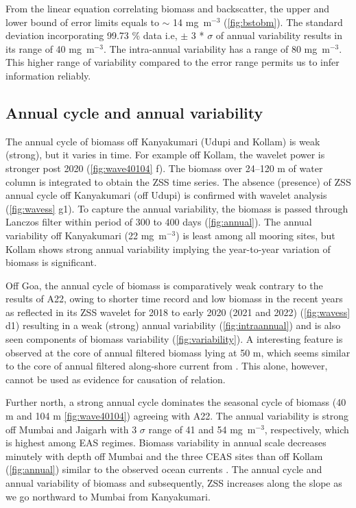 \documentclass{article}
\begin{document}
	From the linear equation correlating biomass and backscatter, the upper and lower bound of error limits equals to $\sim$ 14 mg~m$^{-3}$ (\cref{fig:bstobm}). The standard deviation incorporating 99.73 \% data i.e, $\pm$ 3 * $\sigma$ of annual variability results in its range of 40 mg~m$^{-3}$. The intra-annual variability has a range of 80 mg~m$^{-3}$. This higher range of variability compared to the error range permits us to infer information reliably. 
	
	\subsection{Annual cycle and annual variability}
	\label{sec:annualvar}
    The annual cycle of biomass off Kanyakumari (Udupi and Kollam) is weak (strong), but it varies in time. For example off Kollam, the wavelet power is stronger post 2020 (\cref{fig:wave40104} f). The biomass over 24--120 m of water column is integrated to obtain the ZSS time series. The absence (presence) of ZSS annual cycle off Kanyakumari (off Udupi) is confirmed with wavelet analysis (\cref{fig:wavess} g1). To capture the annual variability, the biomass is passed through Lanczos filter within period of 300 to 400 days (\cref{fig:annual}). The annual variability off Kanyakumari (22 mg~m$^{-3}$) is least among all mooring sites, but Kollam shows strong annual variability implying the year-to-year variation of biomass is significant.
    
    Off Goa, the annual cycle of biomass is comparatively weak contrary to the results of A22, owing to shorter time record and low biomass in the recent years as reflected in its ZSS wavelet for 2018 to early 2020 (2021 and 2022) (\cref{fig:wavess} d1) resulting in a weak (strong) annual variability (\cref{fig:intraannual}) and is also seen components of biomass variability (\cref{fig:variability}). A interesting feature is observed at the core of annual filtered biomass lying at 50 m, which seems similar to the core of annual filtered along-shore current from \citet{nethery2007zm}. This alone, however, cannot be used as evidence for causation of relation.
    
    Further north, a strong annual cycle dominates the seasonal cycle of biomass (40 m and 104 m \cref{fig:wave40104}) agreeing with A22. The annual variability is strong off Mumbai and Jaigarh with 3 $\sigma$ range of 41 and 54 mg~m$^{-3}$, respectively, which is highest among EAS regimes. Biomass variability in annual scale decreases minutely with depth off Mumbai and the three CEAS sites than off Kollam (\cref{fig:annual}) similar to the observed ocean currents \citep{chaudhuri2020observed,chaudhuri2021observed}. The annual cycle and annual variability of biomass and subsequently, ZSS increases along the slope as we go northward to Mumbai from Kanyakumari.  
    
\end{document}
